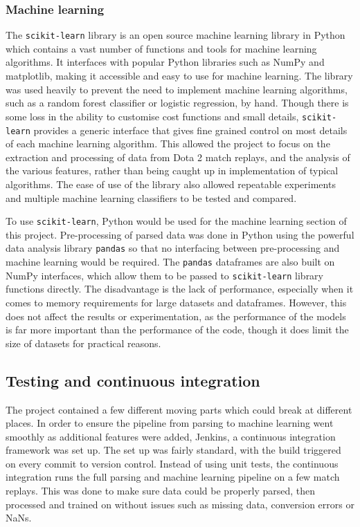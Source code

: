 \documentclass[Report.tex]{subfiles}
\begin{document}
\subsubsection{Machine learning}
The \texttt{scikit-learn} library \cite{sklearn} is an open source machine learning library in Python which contains a vast number of functions and tools for machine learning algorithms. It interfaces with popular Python libraries such as NumPy and matplotlib, making it accessible and easy to use for machine learning. The library was used heavily to prevent the need to implement machine learning algorithms, such as a random forest classifier or logistic regression, by hand. Though there is some loss in the ability to customise cost functions and small details, \texttt{scikit-learn} provides a generic interface that gives fine grained control on most details of each machine learning algorithm. This allowed the project to focus on the extraction and processing of data from Dota 2 match replays, and the analysis of the various features, rather than being caught up in implementation of typical algorithms. The ease of use of the library also allowed repeatable experiments and multiple machine learning classifiers to be tested and compared.

To use \texttt{scikit-learn}, Python would be used for the machine learning section of this project. Pre-processing of parsed data was done in Python using the powerful data analysis library \texttt{pandas} \cite{pandas} so that no interfacing between pre-processing and machine learning would be required. The \texttt{pandas} dataframes are also built on NumPy interfaces, which allow them to be passed to \texttt{scikit-learn} library functions directly. The disadvantage is the lack of performance, especially when it comes to memory requirements for large datasets and dataframes. However, this does not affect the results or experimentation, as the performance of the models is far more important than the performance of the code, though it does limit the size of datasets for practical reasons.

\subsection{Testing and continuous integration}
The project contained a few different moving parts which could break at different places. In order to ensure the pipeline from parsing to machine learning went smoothly as additional features were added, Jenkins, a continuous integration framework was set up. The set up was fairly standard, with the build triggered on every commit to version control. Instead of using unit tests, the continuous integration runs the full parsing and machine learning pipeline on a few match replays. This was done to make sure data could be properly parsed, then processed and trained on without issues such as missing data, conversion errors or NaNs. 
\end{document}
